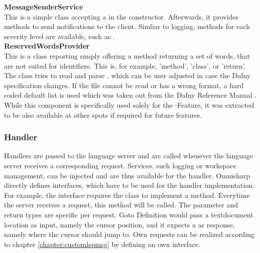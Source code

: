 \textbf{MessageSenderService}\\
This is a simple class accepting a  in the constructor. Afterwards, it provides methods to send notifications to the client. Simliar to logging, methods for each severity level are available, such as .\\

\textbf{ReservedWordsProvider}\\
This is a class reporting simply offering a method returning a set of words, that are not suited for identifiers. This is, for example, 'method', 'class', or 'return'. The class tries to read and parse , which can be user adjusted in case the Dafny specification changes. If the file cannot be read or has a wrong format, a hard coded default list is used which was taken out from the Dafny Reference Manual \cite{dafnyReferenceManual}.\\

While this component is specifically used solely for the -Feature, it was extracted to be also available at other spots if required for future features.\\

\subsubsection{Handler}
Handlers are passed to the language server and are called whenever the language server receives a corresponding request. Services, such logging or workspace management, can be injected and are thus available for the handler. Omnisharp directly defines interfaces, which have to be used for the handler implementation. For example, the interface  requires the class to implement a  method. Everytime the server receives a  request, this  method will be called. The parameter and return types are specific per request. Goto Definition would pass a textdocument location as input, namely the cursor position, and it expects a  as response, namely where the cursor should jump to. Own requests can be realized according to chapter \ref{chapter:customlspmsg} by defining an own interface. \\

